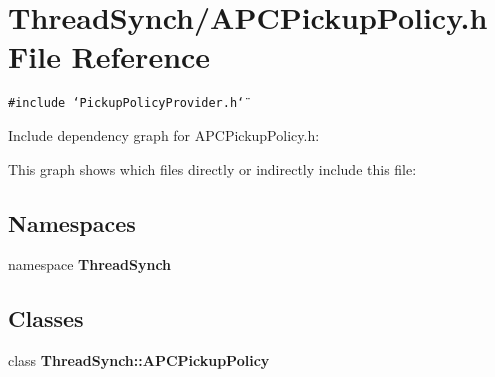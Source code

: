 \section{Thread\-Synch/APCPickup\-Policy.h File Reference}
\label{_a_p_c_pickup_policy_8h}
{\tt \#include \char`\"{}Pickup\-Policy\-Provider.h\char`\"{}}\par


Include dependency graph for APCPickup\-Policy.h:

This graph shows which files directly or indirectly include this file:\subsection*{Namespaces}
\begin{CompactItemize}
\item 
namespace {\bf Thread\-Synch}
\end{CompactItemize}
\subsection*{Classes}
\begin{CompactItemize}
\item 
class {\bf Thread\-Synch::APCPickup\-Policy}
\end{CompactItemize}
